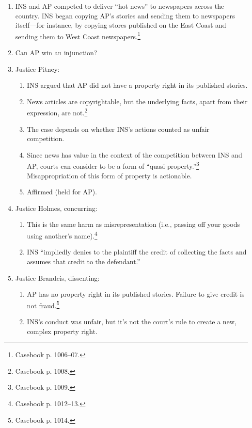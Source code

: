 \begin{enumerate}
    \item INS and AP competed to deliver ``hot news'' to newspapers across the 
    country. INS began copying AP's stories and sending them to newspapers 
    itself---for instance, by copying stores published on the East Coast and 
    sending them to West Coast newspapers.\footnote{Casebook p. 1006--07.}
    \item Can AP win an injunction?
    \item Justice Pitney:
    \begin{enumerate}
        \item INS argued that AP did not have a property right in its 
        published stories.
        \item News articles are copyrightable, but the underlying facts, apart 
        from their expression, are not.\footnote{Casebook p. 1008.}
        \item The case depends on whether INS's actions counted as unfair 
        competition.
        \item Since news has value in the context of the competition between 
        INS and AP, courts can consider to be a form of 
        ``quasi-property.''\footnote{Casebook p. 1009.} Misappropriation of 
        this form of property is actionable.
        \item Affirmed (held for AP).
    \end{enumerate}
    \item Justice Holmes, concurring:
    \begin{enumerate}
        \item This is the same harm as misrepresentation (i.e., passing off 
        your goods using another's name).\footnote{Casebook p. 1012--13.}
        \item INS ``impliedly denies to the plaintiff the credit of collecting 
        the facts and assumes that credit to the defendant.''
    \end{enumerate}
    \item Justice Brandeis, dissenting:
    \begin{enumerate}
        \item AP has no property right in its published stories. Failure to 
        give credit is not fraud.\footnote{Casebook p. 1014.}
        \item INS's conduct was unfair, but it's not the court's rule to 
        create a new, complex property right.
    \end{enumerate}
\end{enumerate}


